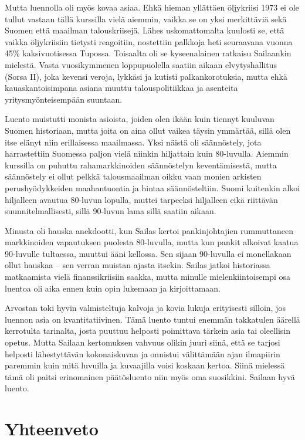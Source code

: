 \documentclass[12pt]{article}
\begin{document}
Mutta luennolla oli myös kovaa asiaa. Ehkä hieman yllättäen öljykriisi 1973 ei ole tullut vastaan tällä kurssilla vielä aiemmin, vaikka se on yksi merkittäviä sekä Suomen että maailman talouskriisejä. Lähes uskomattomalta kuulosti se, että vaikka öljykriisiin tietysti reagoitiin, nostettiin palkkoja heti seuraavana vuonna 45\% kaksivuotisessa Tupossa. Toisaalta oli se kyseenalainen ratkaisu Sailaankin mielestä. Vasta vuosikymmenen loppupuolella saatiin aikaan elvytyshallitus (Sorsa II), joka kevensi veroja, lykkäsi ja kutisti palkankorotuksia, mutta ehkä kauaskantoisimpana asiana muuttu talouspolitiikkaa ja asenteita yritysmyönteisempään suuntaan.

Luento muistutti monista asioista, joiden olen ikään kuin tiennyt kuuluvan Suomen historiaan, mutta joita on aina ollut vaikea täysin ymmärtää, sillä olen itse elänyt niin erillaisessa maailmassa. Yksi näistä oli säännöstely, jota harrastettiin Suomessa paljon vielä niinkin hiljattain kuin 80-luvulla. Aiemmin kurssilla on puhuttu rahamarkkinoiden säännöstelyn keventämisestä, mutta säännöstely ei ollut pelkkä talousmaailman oikku vaan monien arkisten perushyödykkeiden maahantuontia ja hintaa säännösteltiin. Suomi kuitenkin alkoi hiljalleen avautua 80-luvun lopulla, muttei tarpeeksi hiljalleen eikä riittävän suunnitelmallisesti, sillä 90-luvun lama sillä saatiin aikaan.

Minusta oli hauska anekdootti, kun Sailas kertoi pankinjohtajien rummuttaneen markkinoiden vapautuksen puolesta 80-luvulla, mutta kun pankit alkoivat kaatua 90-luvulle tultaessa, muuttui ääni kellossa. Sen sijaan 90-luvulla ei monellakaan ollut hauskaa -- sen verran muistan ajasta itsekin. Sailas jatkoi historiassa matkaamista vielä finanssikriisiin saakka, mutta minulle mielenkiintoisempi osa luentoa oli aika ennen kuin opin lukemaan ja kirjoittamaan.

Arvostan toki hyvin valmisteltuja kalvoja ja kovia lukuja erityisesti silloin, jos luennon asia on kvantitatiivinen. Tämä luento tuntui enemmän takkatulen äärellä kerrotulta tarinalta, josta puuttuu helposti poimittava tärkein asia tai oleellisin opetus. Mutta Sailaan kertomuksen vahvuus olikin juuri siinä, että se tarjosi helposti lähestyttävän kokonaiskuvan ja onnistui välittämään ajan ilmapiirin paremmin kuin mitä luvuilla ja kuvaajilla voisi koskaan kertoa. Siinä mielessä tämä oli paitsi erinomainen päätösluento niin myös oma suosikkini. Sailaan hyvä luento.


\newpage
\section{Yhteenveto}
\end{document}
